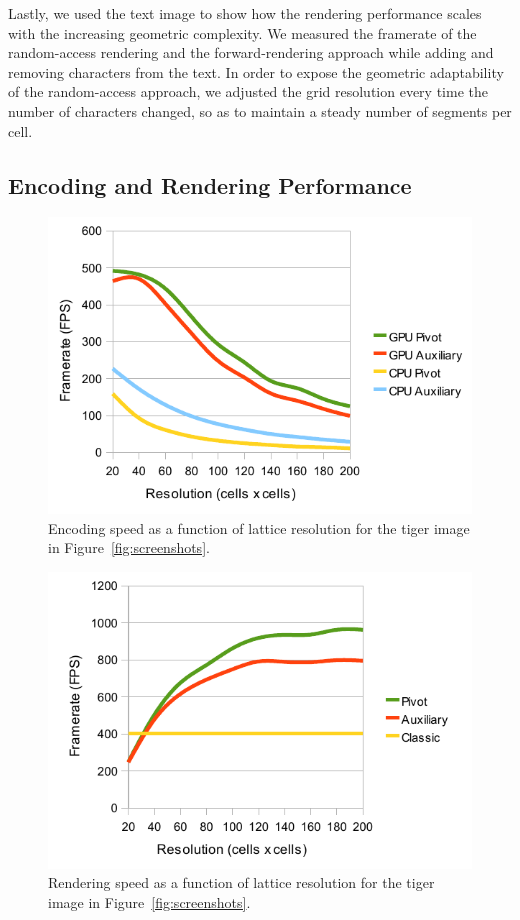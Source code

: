 \documentclass[11pt,a4paper,twoside]{article}
\begin{document}
Lastly, we used the text image to show how the rendering performance scales with the increasing geometric complexity. We measured the framerate of the random-access rendering and the forward-rendering approach while adding and removing characters from the text. In order to expose the geometric adaptability of the random-access approach, we adjusted the grid resolution every time the number of characters changed, so as to maintain a steady number of segments per cell.

\subsection {Encoding and Rendering Performance}

\begin {figure} [h]
	\centering
	\includegraphics[width=0.6\columnwidth] {figures/graph_grid_encode}
	\caption {Encoding speed as a function of lattice resolution for the tiger image in Figure~\ref{fig:screenshots}.}
	\label {fig:graph_grid_encode}
\end {figure}

\begin {figure} [h]
	\centering
	\includegraphics[width=0.6\columnwidth] {figures/graph_grid_render}
	\caption {Rendering speed as a function of lattice resolution for the tiger image in Figure~\ref{fig:screenshots}.}
	\label {fig:graph_grid_render}
\end {figure}
\end{document}
